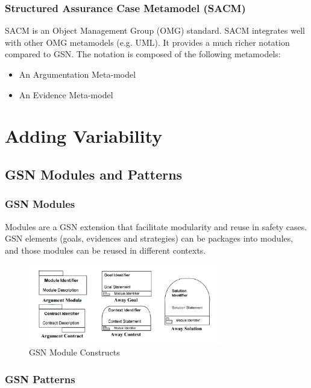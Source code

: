 \documentclass[11pt]{article}
\begin{document}
\subsubsection{Structured Assurance Case Metamodel (SACM)}

SACM \cite{SACM} is an Object Management Group (OMG) standard. SACM integrates well with other OMG metamodels (e.g. UML). It provides a much richer notation compared to GSN. The notation is composed of the following metamodels:

\begin{itemize}
\item An Argumentation Meta-model
\item An Evidence Meta-model
\end{itemize}

\section{Adding Variability}

\subsection{GSN Modules and Patterns}

\subsubsection{GSN Modules}

Modules are a GSN extension that facilitate modularity and reuse in safety cases. GSN elements (goals, evidences and strategies) can be packages into modules, and those modules can be reused in different contexts.

\begin{figure}
  \centering
  \includegraphics[width=0.75\textwidth]{gsn-modules}
  \caption{GSN Module Constructs}
\end{figure}

\subsubsection{GSN Patterns}
\end{document}
